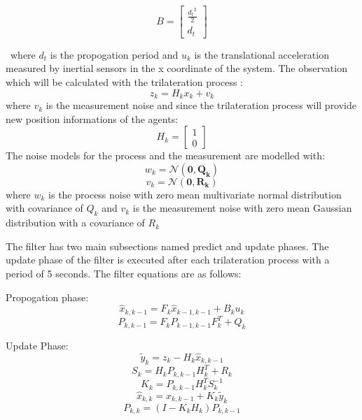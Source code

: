 \documentclass[twoside]{article}
\begin{document}
\begin{multicols}{2}
	\begin{equation}
B = \begin{bmatrix}
\frac{{d_t}^2}{2} \\
d_t
\end{bmatrix}
	\end{equation}
	
	\
	where $d_t$ is the propogation period and $u_k$ is the translational acceleration measured by inertial sensors in the x coordinate of the system. The observation which will be calculated with the trilateration process :
	\begin{equation}
z_k = H_kx_k + v_k
	\end{equation}
	where $v_k$ is the measurement noise and since the trilateration process will provide new position informations of the agents:
	\begin{equation}
H_k = \begin{bmatrix}
1\\0
\end{bmatrix}
	\end{equation}
	The noise models for the process and the measurement are modelled with:
	\begin{equation}
 w_k = \mathcal{N}(\mathbf{0,Q_k})
	\end{equation}
		\begin{equation}
		v_k = \mathcal{N}(\mathbf{0,R_k})
		\end{equation}
		where $w_k$ is the process noise with zero mean multivariate normal distribution with covariance of $Q_k$ and $v_k$ is the measurement noise with zero mean Gaussian distribution with a covariance of $R_k$
		
		The filter has two main subsections named predict and update phases. The update phase of the filter is executed after each trilateration process with a period of 5 seconds. The filter equations are as follows:
		
		Propogation phase:
		\begin{equation}
    \hat{x}_{k,k-1} = F_k\hat{x}_{k-1,k-1} + B_ku_k
		\end{equation}
		\begin{equation}
 P_{k,k-1} = F_k P_{k-1,k-1}F^T_k + Q_k
		\end{equation}
		
		Update Phase:
		\begin{equation}
\tilde{y}_k = z_k - H_k  \hat{x}_{k,k-1} 
\end{equation}
	\begin{equation}
S_k = H_k P_{k,k-1} H^T_k + R_k
\end{equation}
	\begin{equation}
K_k =  P_{k,k-1} H^T_kS_k^{-1}
		\end{equation}
		\begin{equation}
 \hat{x}_{k,k} =  \hat{x}_{k,k-1} + K_k \tilde{y}_k
		\end{equation}
		\begin{equation}
P_{k,k} = (I - K_kH_k)P_{k,k-1}
		\end{equation}
		

\end{multicols}
\end{document}
